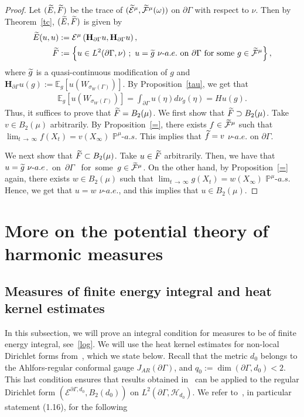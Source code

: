 \documentclass[10pt]{amsart}
\theoremstyle{definition}\newtheorem{defi}[theo]{Definition}\newtheorem{rema}[theo]{Remark}\newtheorem{exam}[theo]{Example}\newtheorem{exem}[theo]{Example}\newtheorem{nota}[theo]{Notation}
\newcommand{\ce}{\mathcal{E}}
\newcommand{\cf}{\mathcal{F}}
\newcommand{\ch}{\mathcal{H}}
\newcommand{\bp}{\mathbb{P}}
\newcommand{\be}{\mathbb{E}}
\newcommand{\bfH}{\mathbf{H}}
\let\oldtilde\tilde
\renewcommand*{\tilde}[1]{\mathchoice{\widetilde{#1}}{\widetilde{#1}}{\oldtilde{#1}}{\oldtilde{#1}}}
\begin{document}
\begin{proof}
Let $(\tilde{E},\tilde{F})$ be the trace of $(\tilde\ce^{\mu}, \tilde\cf^{\mu}(\omega))$ on $\partial\Gamma$ with respect to $\nu$. Then by Theorem~\ref{tc}, $(\tilde{E},\tilde{F})$ is given by
\begin{align*}
\tilde{E}(u,u)&:=\ce^{\mu}\left(\bfH_{\partial\Gamma}u,\bfH_{\partial\Gamma}u\right),\\
\tilde{F}&:=\left\{u\in L^2(\partial\Gamma,\nu)\ ;\ u=\tilde{g}\ \nu\mathchar`-a.e.\ \text{on}\ \partial\Gamma
\ \text{for\ some}\ g\in\tilde\cf^{\mu}\right\},
\end{align*}
where $\tilde{g}$ is a quasi-continuous modification of $g$ and $\bfH_{\partial\Gamma}u(g):=\be_g[u(W_{\sigma_W(\Gamma)})]$. By Proposition~\ref{tau}, we get that
\begin{align*}
\be_g\left[u\left(W_{\sigma_W(\Gamma)}\right)\right]=\int_{\partial\Gamma}u(\eta)d\nu_g(\eta)=Hu(g).
\end{align*}
Thus, it suffices to prove that $\tilde{F}=B_2(\mu)$. We first show that $\tilde{F}\supset B_2(\mu)$. Take $v\in B_2(\mu)$ arbitrarily. By Proposition~\ref{=}, there exists $f\in\tilde\cf^{\mu}$ such that $\lim_{t\,\to\,\infty}f(X_t)=v(X_{\infty})$ ${\bp}^{\mu}$-$a.s.$ This implies that $\tilde{f}=v$ $\nu$-$a.e.$ on $\partial\Gamma$.

We next show that $\tilde{F}\subset B_2(\mu)$. Take $u\in\tilde{F}$ arbitrarily. Then, we have that $u=\tilde{g}\ \nu\mathchar`-a.e$.\ on\ $\partial\Gamma$
\ for\ some\ $g\in\tilde\cf^{\mu}$. On the other hand, by Proposition~\ref{=} again, there exists $w\in B_2(\mu)$ such that $\lim_{t\,\to\,\infty}g(X_t)=w(X_{\infty})$ ${\bp}^{\mu}$-$a.s.$ Hence, we get that $u=w$ $\nu$-$a.e.$, and this implies that $u\in B_2(\mu)$.
\end{proof}

\section{More on the potential theory of harmonic measures}\label{sect9}
\subsection{Measures of finite energy integral and heat kernel estimates}

In this subsection, we will prove an integral condition for measures to be of finite energy integral, see~\eqref{log}. We will use the heat kernel estimates for non-local Dirichlet forms from~\cite{CK,CKW,GHH}, which we state below. Recall that the metric $d_0$ belongs to the Ahlfors-regular conformal gauge $J_{AR}(\partial\Gamma)$, and $q_0:=\dim(\partial\Gamma,d_0)<2$. This last condition ensures that results obtained in~\cite{GHH} can be applied to the regular Dirichlet form $(\ce^{\partial\Gamma,d_0},B_2(d_0))$ on $L^2(\partial\Gamma,\ch_{d_0})$. We refer to~\cite{GHH}, in particular statement (1.16), for the following
\end{document}
